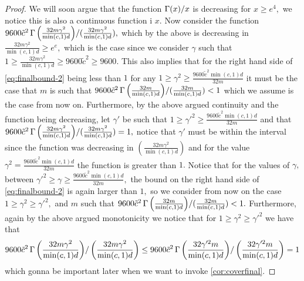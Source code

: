 \begin{proof}
    We will soon argue that the function $\operatorname{\Gamma}(x)/x$ is decreasing for $ x\geq e^{4},$ we notice this is also a continuous function i $ x.$ 
    Now consider the function $ 9600\tilde{c}^2 \operatorname{\Gamma}{\left(  \frac{32 m\gamma^{2} }{\min(c,1)d} \right)}/(\frac{32 m\gamma^{2} }{\min(c,1)d} ),$ which by the above is decreasing in $  \frac{32m\gamma^{2} }{\min(c,1)d}\geq e^{e},$ which is the case since we consider $ \gamma $ such that  $1\geq \frac{32 m\gamma^{2} }{\min(c,1)d} \geq 9600\tilde{c}^2\geq 9600.$ 
    This also implies that for the right hand side of \cref{eq:finalbound-2} being less than $ 1 $ for any $1\geq \gamma^{2}\geq \frac{9600\tilde{c}^2 \min(c,1)d}{32m} $ it must be the case that $ m $ is such that $9600\tilde{c}^2 \operatorname{\Gamma}{\left(  \frac{32 m }{\min(c,1)d} \right)}/(\frac{32m }{\min(c,1)d} )< 1$ which we assume is the case from now on.  
    Furthermore, by the above argued continuity and the function being decreasing, let $ \gamma' $ be such that   $ 1\geq\gamma'^{2} \geq \frac{9600\tilde{c}^2 \min(c,1)d}{32m} $ and that $ 9600\tilde{c}^2 \operatorname{\Gamma}{\left(  \frac{32 m\gamma^{2} }{\min(c,1)d} \right)}/(\frac{32 m\gamma^{2} }{\min(c,1)d} )=1,$ notice that $ \gamma' $ must be within the interval since the function was decreasing in $ \left(  \frac{32 m\gamma^{2} }{\min(c,1)d} \right) $ and for the value $\gamma^{2}=  \frac{9600\tilde{c}^2 \min(c,1)d}{32m}$ the function is greater than $1.$ Notice that for the values of $ \gamma,$ between $ \gamma'^{2}\geq \gamma \geq \frac{9600\tilde{c}^2 \min(c,1)d}{32m},$ the bound on the right hand side of \cref{eq:finalbound-2} is again larger than $ 1,$ so we consider from now on the case $ 1\geq\gamma^{2}\geq\gamma'^{2},$ and $ m $  such that $9600\tilde{c}^2 \operatorname{\Gamma}{\left(  \frac{32m }{\min(c,1)d} \right)}/(\frac{32m }{\min(c,1)d} )<1.$ Furthermore, again by the above argued monotonicity we notice that for $ 1\geq\gamma^{2}\geq \gamma'^{2} $ we have that 
    \begin{align}\label{eq:finalbound-3}
        9600\tilde{c}^2 \operatorname{\Gamma}{\left(  \frac{32 m\gamma^{2} }{\min(c,1)d} \right)}/\left(\frac{32 m\gamma^{2} }{\min(c,1)d} \right) 
        \leq 9600\tilde{c}^2 \operatorname{\Gamma}{\left(  \frac{32 \gamma'^{2}m }{\min(c,1)d} \right)}/\left(\frac{32 \gamma'^{2}m }{\min(c,1)d} \right)= 1
    \end{align}  
    which gonna be important later when we want to invoke \cref{cor:coverfinal}.   
    

\end{proof}
